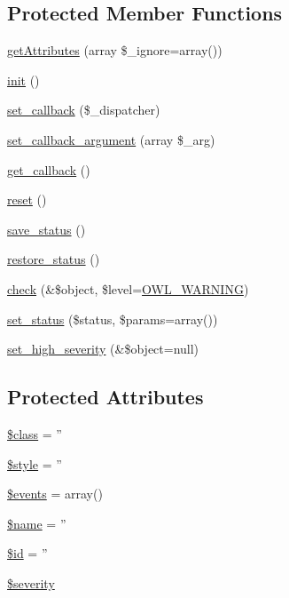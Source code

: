 \subsection*{Protected Member Functions}
\begin{DoxyCompactItemize}
\item 
\hyperlink{classBaseElement_a5cb9a5224e12b4d7017531ee5e2c9778}{getAttributes} (array \$\_\-ignore=array())
\item 
\hyperlink{class__OWL_ae0ef3ded56e8a6b34b6461e5a721cd3e}{init} ()
\item 
\hyperlink{class__OWL_a28d9025eaf37b49d63cb334ed28c33f0}{set\_\-callback} (\$\_\-dispatcher)
\item 
\hyperlink{class__OWL_a1e26611ce858b237f5a98a91ea3c3a1b}{set\_\-callback\_\-argument} (array \$\_\-arg)
\item 
\hyperlink{class__OWL_abded13b1c97ea6e0cfe3c68cb6bcf7a5}{get\_\-callback} ()
\item 
\hyperlink{class__OWL_a2f2a042bcf31965194c03033df0edc9b}{reset} ()
\item 
\hyperlink{class__OWL_a9e49b9c76fbc021b244c6915ea536d71}{save\_\-status} ()
\item 
\hyperlink{class__OWL_a465eeaf40edd9f9c848841700c32ce55}{restore\_\-status} ()
\item 
\hyperlink{class__OWL_ae2e3c56e5f3c4ce4156c6b1bb1c50f63}{check} (\&\$object, \$level=\hyperlink{owl_8severitycodes_8php_ace886152e2e86cd2e91cb833fd495adb}{OWL\_\-WARNING})
\item 
\hyperlink{class__OWL_aea912d0ede9b3c2a69b79072d94d4787}{set\_\-status} (\$status, \$params=array())
\item 
\hyperlink{class__OWL_a576829692a3b66e3d518853bf43abae3}{set\_\-high\_\-severity} (\&\$object=null)
\end{DoxyCompactItemize}
\subsection*{Protected Attributes}
\begin{DoxyCompactItemize}
\item 
\hyperlink{classBaseElement_a99976a8e967db92e7800309f359b0803}{\$class} = ''
\item 
\hyperlink{classBaseElement_a429a3d642dd95f30e1059ef29564b87d}{\$style} = ''
\item 
\hyperlink{classBaseElement_a02cebe45d277b4ff8f29db08bad371ba}{\$events} = array()
\item 
\hyperlink{classBaseElement_a30b8cff187a9de659a70daf287d66f45}{\$name} = ''
\item 
\hyperlink{classBaseElement_a11b6989c43b53869a09f5ce65aa55b45}{\$id} = ''
\item 
\hyperlink{class__OWL_ad26b40a9dbbacb33e299b17826f8327c}{\$severity}
\end{DoxyCompactItemize}
